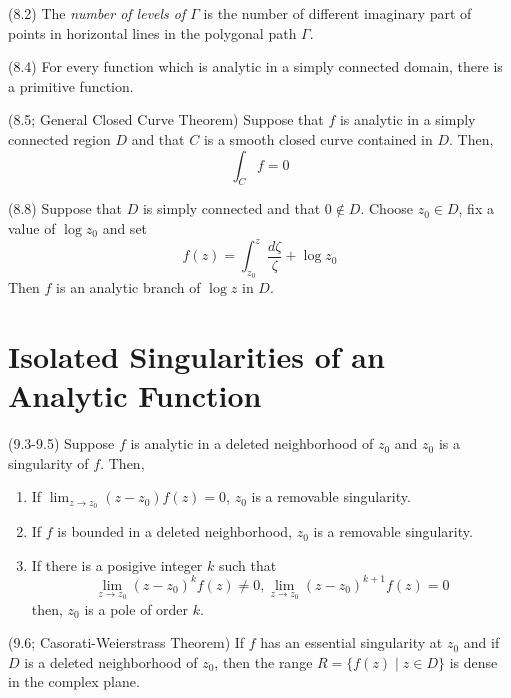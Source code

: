 \documentclass{article}
\begin{document}
\begin{definition}(8.2)
  The \emph{number of levels of \(\Gamma\)}
  is the number of different imaginary part of points in horizontal lines in
  the polygonal path \(\Gamma\).
\end{definition}

\begin{theorem}(8.4)
  For every function which is analytic in a simply connected domain,
  there is a primitive function.
\end{theorem}

\begin{theorem}(8.5; General Closed Curve Theorem)
  Suppose that \(f\) is analytic in a simply connected region \(D\)
  and that \(C\) is a smooth closed curve contained in \(D\).
  Then,
  \[\int_C f = 0\]
\end{theorem}

\begin{theorem}(8.8)
  Suppose that \(D\) is simply connected
  and that \(0 \not\in D\).
  Choose \(z_0 \in D\),
  fix a value of \(\log z_0\) and set
  \[f(z) = \int_{z_0}^z \frac{d\zeta}{\zeta} + \log z_0\]
  Then \(f\) is an analytic branch of \(\log z\) in \(D\).
\end{theorem}

\section{Isolated Singularities of an Analytic Function}

\begin{theorem}(9.3-9.5)
  Suppose \(f\) is analytic in a deleted neighborhood of \(z_0\)
  and \(z_0\) is a singularity of \(f\).
  Then,
  \begin{enumerate}
  \item If \(\lim_{z \to z_0} (z-z_0)f(z) = 0\), \(z_0\) is a removable singularity.
  \item If \(f\) is bounded in a deleted neighborhood, \(z_0\) is a removable singularity.
  \item If there is a posigive integer \(k\) such that
  \[\lim_{z \to z_0} (z-z_0)^k f(z) \neq 0, \lim_{z \to z_0} (z-z_0)^{k+1} f(z) = 0 \]
  then, \(z_0\) is a pole of order \(k\).
  \end{enumerate}
\end{theorem}

\begin{theorem}(9.6; Casorati-Weierstrass Theorem)
  If \(f\) has an essential singularity at \(z_0\)
  and if \(D\) is a deleted neighborhood of \(z_0\),
  then the range \(R = \{f(z) \mid z \in D\}\)
  is dense in the complex plane.
\end{theorem}
\end{document}
